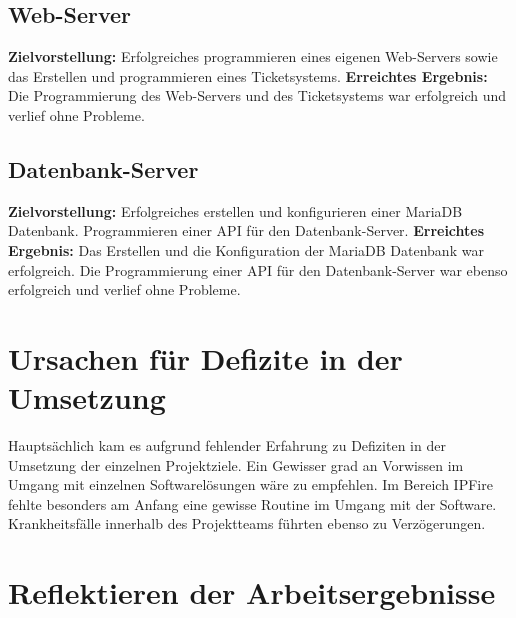 \documentclass{scrartcl}
\begin{document}
\begin{flushleft}
    \newpage

    \subsection{Web-Server}
    \textbf{Zielvorstellung:} \newline
    Erfolgreiches programmieren eines eigenen Web-Servers sowie das Erstellen und programmieren eines Ticketsystems. \newline
    \textbf{Erreichtes Ergebnis:} \newline
    Die Programmierung des Web-Servers und des Ticketsystems war erfolgreich und verlief ohne Probleme. \newline

    \subsection{Datenbank-Server }
    \textbf{Zielvorstellung:} \newline
    Erfolgreiches erstellen und konfigurieren einer MariaDB Datenbank. Programmieren einer API für den Datenbank-Server. \newline
    \textbf{Erreichtes Ergebnis:} \newline
    Das Erstellen und die Konfiguration der MariaDB Datenbank war erfolgreich. Die Programmierung einer API für den Datenbank-Server war ebenso erfolgreich und verlief ohne Probleme. \newline
 
    \section{Ursachen für Defizite in der Umsetzung}
    Hauptsächlich kam es aufgrund fehlender Erfahrung zu Defiziten in der Umsetzung der einzelnen Projektziele. Ein Gewisser grad an Vorwissen im Umgang mit einzelnen Softwarelösungen wäre zu empfehlen. Im Bereich IPFire fehlte besonders am Anfang eine gewisse Routine im Umgang mit der Software. Krankheitsfälle innerhalb des Projektteams führten ebenso zu Verzögerungen.


    \newpage

    \section{Reflektieren der Arbeitsergebnisse}

\end{flushleft}
\end{document}
